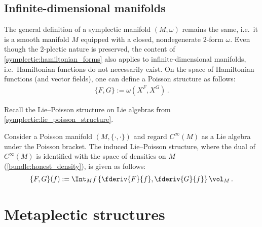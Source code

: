 \subsection{Infinite-dimensional manifolds}

    The general definition of a symplectic manifold $(M,\omega)$ remains the same, i.e.~it is a smooth manifold $M$ equipped with a closed, nondegenerate $2$-form $\omega$. Even though the 2-plectic nature is preserved, the content of \cref{symplectic:hamiltonian_forms} also applies to infinite-dimensional manifolds, i.e.~Hamiltonian functions do not necessarily exist. On the space of Hamiltonian functions (and vector fields), one can define a Poisson structure as follows:
    \begin{gather}
        \{F,G\} := \omega(X^F,X^G)\,.
    \end{gather}


    Recall the Lie--Poisson structure on Lie algebras from \cref{symplectic:lie_poisson_structure}.
    \begin{example}
        Consider a Poisson manifold $(M,\{\cdot,\cdot\})$ and regard $C^\infty(M)$ as a Lie algebra under the Poisson bracket. The induced Lie--Poisson structure, where the dual of $C^\infty(M)$ is identified with the space of densities on $M$ (\cref{bundle:honest_density}), is given as follows:
        \begin{gather}
            \{F,G\}(f) := \Int_Mf\left\{\fderiv{F}{f},\fderiv{G}{f}\right\}\vol_M\,.
        \end{gather}
    \end{example}


\section{Metaplectic structures}


